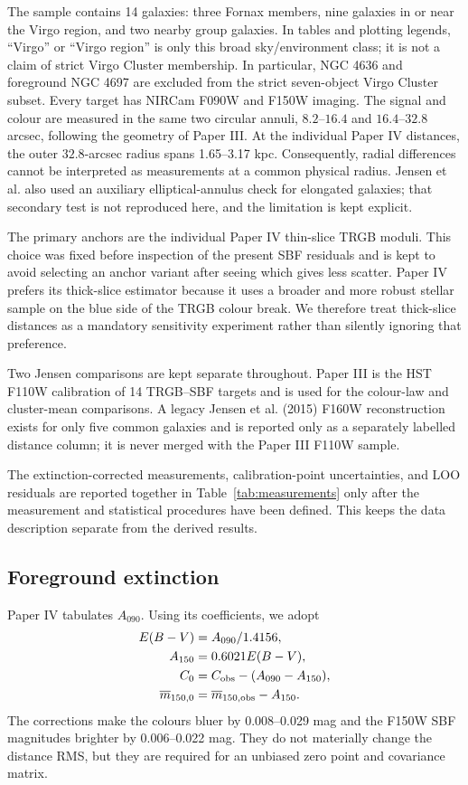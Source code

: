 \documentclass[nodoi,nocopyright]{pas}
\newcommand{\mbar}{\overline{m}}
\begin{document}
The sample contains 14 galaxies: three Fornax members, nine galaxies in or
near the Virgo region, and two nearby group galaxies. In tables and plotting
legends, ``Virgo'' or ``Virgo region'' is only this broad sky/environment
class; it is not a claim of strict Virgo Cluster membership. In particular,
NGC 4636 and foreground NGC 4697 are excluded from the strict seven-object
Virgo Cluster subset. Every target has NIRCam
F090W and F150W imaging. The signal and colour are measured in the same two
circular annuli, $8.2$--$16.4$ and $16.4$--$32.8$ arcsec, following the
geometry of Paper III. At the individual Paper IV distances, the outer
$32.8$-arcsec radius spans 1.65--3.17 kpc. Consequently, radial differences
cannot be interpreted as measurements at a common physical radius. Jensen
et al. also used an auxiliary elliptical-annulus check for elongated
galaxies; that secondary test is not reproduced here, and the limitation is
kept explicit.

The primary anchors are the individual Paper IV thin-slice TRGB moduli. This
choice was fixed before inspection of the present SBF residuals and is kept to
avoid selecting an anchor variant after seeing which gives less scatter.
Paper IV prefers its thick-slice estimator because it uses a broader and more
robust stellar sample on the blue side of the TRGB colour break. We therefore
treat thick-slice distances as a mandatory sensitivity experiment rather than
silently ignoring that preference.

Two Jensen comparisons are kept separate throughout. Paper III is the HST
F110W calibration of 14 TRGB--SBF targets and is used for the colour-law and
cluster-mean comparisons. A legacy Jensen et al. (2015) F160W reconstruction
exists for only five common galaxies and is reported only as a separately
labelled distance column; it is never merged with the Paper III F110W sample.

The extinction-corrected measurements, calibration-point uncertainties, and
LOO residuals are reported together in Table~\ref{tab:measurements} only after
the measurement and statistical procedures have been defined. This keeps the
data description separate from the derived results.

\subsection{Foreground extinction}

Paper IV tabulates $A_{090}$. Using its coefficients, we adopt
\begin{align}
 E(B-V)&=A_{090}/1.4156,\\
 A_{150}&=0.6021E(B-V),\\
 C_0&=C_{\rm obs}-(A_{090}-A_{150}),\\
 \mbar_{150,0}&=\mbar_{150,\rm obs}-A_{150}.
\end{align}
The corrections make the colours bluer by 0.008--0.029 mag and the F150W SBF
magnitudes brighter by 0.006--0.022 mag. They do not materially change the
distance RMS, but they are required for an unbiased zero point and covariance
matrix.
\end{document}
